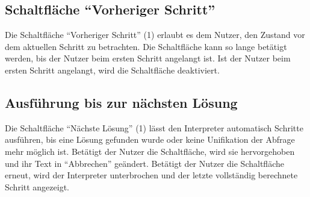 \documentclass[parskip=full,11pt,twoside]{scrartcl}
\begin{document}
\subsection{Schaltfläche \enquote{Vorheriger Schritt}}

\begin{minipage}{\linewidth}
\end{minipage}

\begin{minipage}{\linewidth}
\end{minipage}

Die Schaltfläche \enquote{Vorheriger Schritt} (1) erlaubt es dem Nutzer, den Zustand vor dem aktuellen Schritt zu betrachten.
Die Schaltfläche kann so lange betätigt werden, bis der Nutzer beim ersten Schritt angelangt ist.
Ist der Nutzer beim ersten Schritt angelangt, wird die Schaltfläche deaktiviert.

\subsection{Ausführung bis zur nächsten Lösung}

\begin{minipage}{\linewidth}
\end{minipage}

\begin{minipage}{\linewidth}
\end{minipage}

Die Schaltfläche \enquote{Nächste Lösung} (1) lässt den Interpreter automatisch Schritte ausführen, bis eine Lösung gefunden wurde oder keine Unifikation der Abfrage mehr möglich ist.
Betätigt der Nutzer die Schaltfläche, wird sie hervorgehoben und ihr Text in \enquote{Abbrechen} geändert.
Betätigt der Nutzer die Schaltfläche erneut, wird der Interpreter unterbrochen und der letzte vollständig berechnete Schritt angezeigt.
\end{document}
